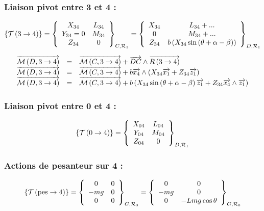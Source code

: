 \documentclass[10pt,fleqn]{article} %
\begin{document}









\subsubsection*{Liaison pivot entre 3 et 4 :}
$$
\torseurstat{T}{3}{4}
=\torseurcol{X_{34}}{Y_{34}=0}{Z_{34}}{L_{34}}{M_{34}}{0}{C,\mathcal{R}_1}
=\torseurcol{X_{34}}{0}{Z_{34}}{L_{34}+...}{M_{34}+...}{ b \left( X_{34} \sin \left(\theta + \alpha -\beta\right)    \right)}{D,\mathcal{R}_1}
$$

$$
\begin{array}{lcl}
\vectm{D}{3}{4} &=& \vectm{C}{3}{4} + \vect{DC} \wedge \vectf{3}{4} \\
\vectm{D}{3}{4} &=& \vectm{C}{3}{4} + b\vect{x_4} \wedge \left( X_{34} \vect{x_1}  +Z_{34} \vect{z_1}  \right)  \\
\vectm{D}{3}{4} &=& \vectm{C}{3}{4} + b \left( X_{34} \sin \left(\theta + \alpha -\beta\right) \vect{z_1}+Z_{34} \vect{x_4} \wedge\vect{z_1}  \right)  \\
\end{array}
$$

 
 
 
\subsubsection*{Liaison pivot entre 0 et 4 :}
$$
\torseurstat{T}{0}{4}=\torseurcol{X_{04}}{Y_{04}}{Z_{04}}{L_{04}}{M_{04}}{0}{D,\mathcal{R}_1}
$$

\subsubsection*{Actions de pesanteur sur 4 :}
$$
\torseurstat{T}{\text{pes}}{4}
=\torseurcol{0}{-mg}{0}{0}{0}{0}{G,\mathcal{R}_0}
=\torseurcol{0}{-mg}{0}{0}{0}{-Lmg \cos \theta }{G,\mathcal{R}_0}
$$

\end{document}
